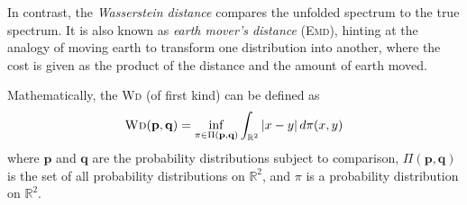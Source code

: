 In contrast,
the \emph{Wasserstein distance}
compares the unfolded spectrum to the true spectrum.
%
It is also known as \emph{earth mover's distance} (\textsc{Emd}),
  hinting at the analogy of moving earth to transform one distribution into another,
    where the cost is given as the product of the distance and the amount of earth moved.

Mathematically, the \textsc{Wd} (of first kind) can be defined as
\begin{equation}
  \text{\textsc{Wd}}(\mathbf{p}, \mathbf{q}) = \inf_{\pi \in \Pi(\mathbf{p}, \mathbf{q})} \int_{\mathbb{R}^2} |x - y| \, d\pi(x, y)
\end{equation}
where
  $\mathbf{p}$ and $\mathbf{q}$ are the probability distributions subject to comparison,
  $\Pi(\mathbf{p}, \mathbf{q})$ is the set of all probability distributions on $\mathbb{R}^2$,
  and $\pi$ is a probability distribution on $\mathbb{R}^2$.
